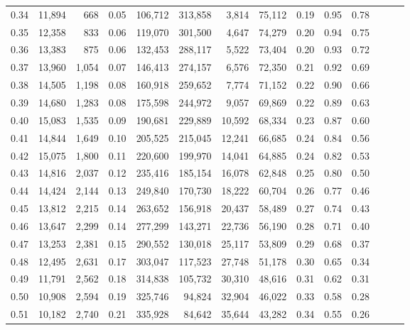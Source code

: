 \begin{tabular}{rrrrrrrrrrrrrr}
0.34 &  11,894 &    668 &  0.05 &  106,712 &  313,858 &   3,814 &  75,112 &  0.19 &  0.95 &      0.78 \\
0.35 &  12,358 &    833 &  0.06 &  119,070 &  301,500 &   4,647 &  74,279 &  0.20 &  0.94 &      0.75 \\
0.36 &  13,383 &    875 &  0.06 &  132,453 &  288,117 &   5,522 &  73,404 &  0.20 &  0.93 &      0.72 \\
0.37 &  13,960 &  1,054 &  0.07 &  146,413 &  274,157 &   6,576 &  72,350 &  0.21 &  0.92 &      0.69 \\
0.38 &  14,505 &  1,198 &  0.08 &  160,918 &  259,652 &   7,774 &  71,152 &  0.22 &  0.90 &      0.66 \\
0.39 &  14,680 &  1,283 &  0.08 &  175,598 &  244,972 &   9,057 &  69,869 &  0.22 &  0.89 &      0.63 \\
0.40 &  15,083 &  1,535 &  0.09 &  190,681 &  229,889 &  10,592 &  68,334 &  0.23 &  0.87 &      0.60 \\
0.41 &  14,844 &  1,649 &  0.10 &  205,525 &  215,045 &  12,241 &  66,685 &  0.24 &  0.84 &      0.56 \\
0.42 &  15,075 &  1,800 &  0.11 &  220,600 &  199,970 &  14,041 &  64,885 &  0.24 &  0.82 &      0.53 \\
0.43 &  14,816 &  2,037 &  0.12 &  235,416 &  185,154 &  16,078 &  62,848 &  0.25 &  0.80 &      0.50 \\
0.44 &  14,424 &  2,144 &  0.13 &  249,840 &  170,730 &  18,222 &  60,704 &  0.26 &  0.77 &      0.46 \\
0.45 &  13,812 &  2,215 &  0.14 &  263,652 &  156,918 &  20,437 &  58,489 &  0.27 &  0.74 &      0.43 \\
0.46 &  13,647 &  2,299 &  0.14 &  277,299 &  143,271 &  22,736 &  56,190 &  0.28 &  0.71 &      0.40 \\
0.47 &  13,253 &  2,381 &  0.15 &  290,552 &  130,018 &  25,117 &  53,809 &  0.29 &  0.68 &      0.37 \\
0.48 &  12,495 &  2,631 &  0.17 &  303,047 &  117,523 &  27,748 &  51,178 &  0.30 &  0.65 &      0.34 \\
0.49 &  11,791 &  2,562 &  0.18 &  314,838 &  105,732 &  30,310 &  48,616 &  0.31 &  0.62 &      0.31 \\
0.50 &  10,908 &  2,594 &  0.19 &  325,746 &   94,824 &  32,904 &  46,022 &  0.33 &  0.58 &      0.28 \\
0.51 &  10,182 &  2,740 &  0.21 &  335,928 &   84,642 &  35,644 &  43,282 &  0.34 &  0.55 &      0.26 \\

\end{tabular}
